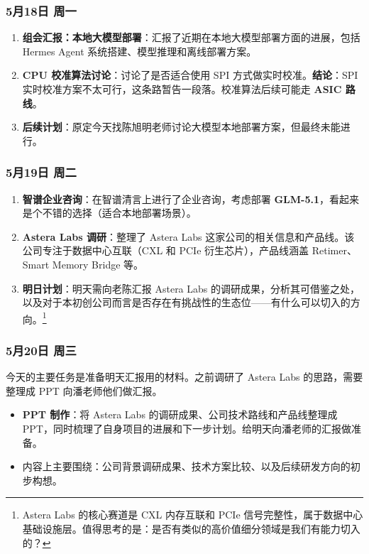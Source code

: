 \subsubsection{5月18日 周一}

\begin{enumerate}
  \item \textbf{组会汇报：本地大模型部署}：汇报了近期在本地大模型部署方面的进展，包括 Hermes Agent 系统搭建、模型推理和离线部署方案。
  \item \textbf{CPU 校准算法讨论}：讨论了是否适合使用 SPI 方式做实时校准。\textbf{结论}：SPI 实时校准方案不太可行，这条路暂告一段落。校准算法后续可能走 \textbf{ASIC 路线}。
  \item \textbf{后续计划}：原定今天找陈旭明老师讨论大模型本地部署方案，但最终未能进行。
\end{enumerate}

\subsubsection{5月19日 周二}

\begin{enumerate}
  \item \textbf{智谱企业咨询}：在智谱清言上进行了企业咨询，考虑部署 \textbf{GLM-5.1}，看起来是个不错的选择（适合本地部署场景）。
  \item \textbf{Astera Labs 调研}：整理了 Astera Labs 这家公司的相关信息和产品线。该公司专注于数据中心互联（CXL 和 PCIe 衍生芯片），产品线涵盖 Retimer、Smart Memory Bridge 等。
  \item \textbf{明日计划}：明天需向老陈汇报 Astera Labs 的调研成果，分析其可借鉴之处，以及对于本初创公司而言是否存在有挑战性的生态位——有什么可以切入的方向。\footnote{Astera Labs 的核心赛道是 CXL 内存互联和 PCIe 信号完整性，属于数据中心基础设施层。值得思考的是：是否有类似的高价值细分领域是我们有能力切入的？}
\end{enumerate}

\subsubsection{5月20日 周三}

今天的主要任务是准备明天汇报用的材料。之前调研了 Astera Labs 的思路，需要整理成 PPT 向潘老师他们做汇报。

\begin{itemize}
  \item \textbf{PPT 制作}：将 Astera Labs 的调研成果、公司技术路线和产品线整理成 PPT，同时梳理了自身项目的进展和下一步计划。给明天向潘老师的汇报做准备。
  \item 内容上主要围绕：公司背景调研成果、技术方案比较、以及后续研发方向的初步构想。
\end{itemize}

